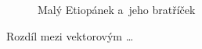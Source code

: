 \documentclass[11pt, a4paper]{article}
\begin{document}
\begin{figure}[h]
{			
		}
		\caption{Malý Etiopánek a~jeho bratříček}
		\label{fig:Etiopanek}
\end{figure}
\newpage

\indent Rozdíl mezi vektorovým \dots
\end{document}
